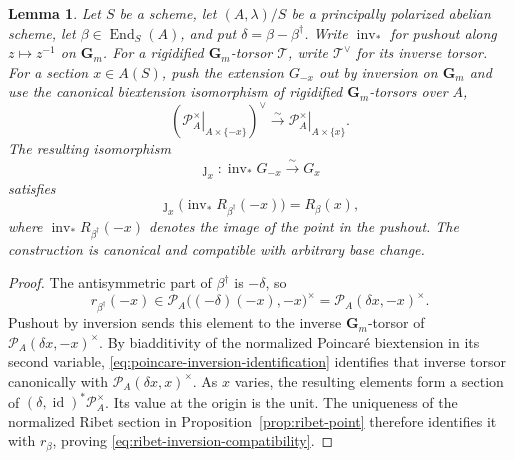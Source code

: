 \documentclass[11pt,letterpaper,reqno]{amsart}
\newtheorem{lemma}[theorem]{Lemma}
\theoremstyle{definition}
\theoremstyle{remark}
\newcommand{\Gm}{\mathbf G_m}
\newcommand{\End}{\operatorname{End}}
\newcommand{\id}{\operatorname{id}}
\newcommand{\cP}{\mathcal P}
\begin{document}
\begin{lemma}
\label{lem:ribet-inversion}
Let $S$ be a scheme, let $(A,\lambda)/S$ be a principally polarized abelian
scheme, let $\beta\in\End_S(A)$, and put $\delta=\beta-\beta^\dagger$.  Write
$\operatorname{inv}_*$ for pushout along $z\mapsto z^{-1}$ on $\Gm$.  For a
rigidified $\Gm$-torsor $\mathcal T$, write $\mathcal T^\vee$ for its inverse
torsor.  For a section $x\in A(S)$, push the extension $G_{-x}$ out by
inversion on $\Gm$ and use the canonical biextension isomorphism of rigidified
$\Gm$-torsors over $A$,
\begin{equation}\label{eq:poincare-inversion-identification}
 \left(\left.\cP_A^\times\right|_{A\times\{-x\}}\right)^\vee
 \xrightarrow{\sim}
 \left.\cP_A^\times\right|_{A\times\{x\}}.
\end{equation}
The resulting isomorphism
\[
 \jmath_x:\operatorname{inv}_*G_{-x}\xrightarrow{\sim}G_x
\]
satisfies
\begin{equation}\label{eq:ribet-inversion-compatibility}
 \jmath_x\bigl(\operatorname{inv}_*R_{\beta^\dagger}(-x)\bigr)=R_\beta(x),
\end{equation}
where $\operatorname{inv}_*R_{\beta^\dagger}(-x)$ denotes the image of the
point in the pushout.
The construction is canonical and compatible with arbitrary base change.
\end{lemma}

\begin{proof}
The antisymmetric part of $\beta^\dagger$ is $-\delta$, so
\[
 r_{\beta^\dagger}(-x)\in
 \cP_A\bigl((-\delta)(-x),-x\bigr)^\times
 =\cP_A(\delta x,-x)^\times.
\]
Pushout by inversion sends this element to the inverse $\Gm$-torsor of
$\cP_A(\delta x,-x)^\times$.  By biadditivity of the normalized Poincar\'e
biextension in its second variable, \eqref{eq:poincare-inversion-identification}
identifies that inverse torsor canonically with
$\cP_A(\delta x,x)^\times$.  As $x$ varies, the resulting elements form a
section of $(\delta,\id)^*\cP_A^\times$.  Its value at the origin is the unit.
The uniqueness of the normalized Ribet section in
Proposition~\ref{prop:ribet-point} therefore identifies it with $r_\beta$, proving
\eqref{eq:ribet-inversion-compatibility}.
\end{proof}
\end{document}

